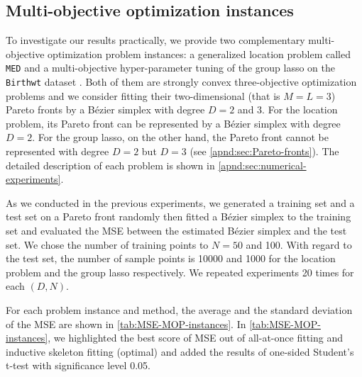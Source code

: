 \documentclass{article}
\begin{document}
\subsection{Multi-objective optimization instances}\label{sec:MOP-instances}
To investigate our results practically, we provide two complementary multi-objective optimization problem instances: a generalized location problem called \texttt{MED} \cite{Harada2006,Hamada2010} and a multi-objective hyper-parameter tuning of the group lasso \cite{Yuan2006} on the \texttt{Birthwt} dataset \cite{Hosmer1989,Venables2002}.
Both of them are strongly convex three-objective optimization problems and we consider fitting their two-dimensional (that is $M = L = 3$) Pareto fronts by a B\'ezier simplex with degree $D = 2$ and 3. %
For the location problem, its Pareto front can be represented by a B\'ezier simplex with degree $D = 2$.
For the group lasso, on the other hand, the Pareto front cannot be represented with degree $D = 2$ but $D = 3$ (see \cref{apnd:sec:Pareto-fronts}).
The detailed description of each problem is shown in \cref{apnd:sec:numerical-experiments}.

As we conducted in the previous experiments, we generated a training set and a test set on a Pareto front randomly then fitted a B\'ezier simplex to the training set and evaluated the MSE between the estimated B\'ezier simplex and the test set. 
We chose the number of training points to $N = 50$ and 100.
With regard to the test set, the number of sample points is 10000 and 1000 for the location problem and the group lasso respectively. 
We repeated experiments 20 times for each $(D, N)$.

For each problem instance and method, the average and the standard deviation of the MSE are shown in \cref{tab:MSE-MOP-instances}. 
In \cref{tab:MSE-MOP-instances}, we highlighted the best score of MSE out of all-at-once fitting and inductive skeleton fitting (optimal) and added the results of one-sided Student's t-test with significance level 0.05.
\end{document}
